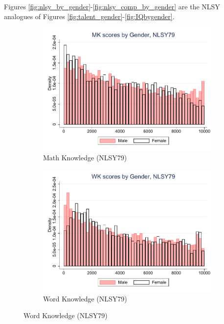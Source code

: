 \documentclass[onehalfspacing,11pt]{article}
\begin{document}
Figures \ref{fig:nlsy_by_gender}-\ref{fig:nlsy_comp_by_gender} are the NLSY analogues of Figures \ref{fig:talent_gender}-\ref{fig:IQbygender}.

\begin{figure}
	\begin{subfigure}{0.49\textwidth}
		\includegraphics[width=\linewidth]{NLSY79_MK_gender.pdf}
		\caption{Math Knowledge (NLSY79)} \label{fig:nlsy79math}
	\end{subfigure}
	\hspace*{\fill} %
	\begin{subfigure}{0.49\textwidth}
		\includegraphics[width=\linewidth]{NLSY79_WK_gender.pdf}
		\caption{Word Knowledge (NLSY79)} \label{fig:nlsy79word}
	\end{subfigure}

\end{figure}
\end{document}

